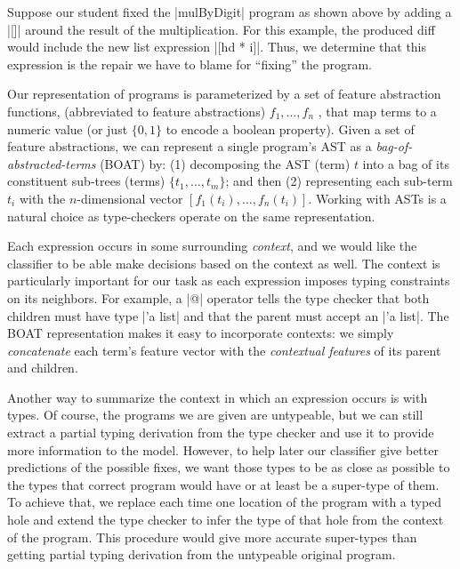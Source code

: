  Suppose our student fixed the |mulByDigit| program as shown
above by adding a |[]| around the result of the multiplication. For this
example, the produced diff would include the new list expression |[hd * i]|.
Thus, we determine that this expression is the repair we have to blame for
``fixing'' the program.

 Our representation of programs is
parameterized by a set of feature abstraction functions, (abbreviated to feature
abstractions) $f_1, \ldots, f_n$ , that map terms to a numeric value (or just
$\{0, 1\}$ to encode a boolean property). Given a set of feature abstractions,
we can represent a single program's AST as a \emph{bag-of-abstracted-terms}
(BOAT) by:
%
(1) decomposing the AST (term) $t$ into a bag of its constituent sub-trees
(terms) $\{t_1, \ldots, t_m\}$; and then
%
(2) representing each sub-term $t_i$ with the $n$-dimensional vector $[f_1(t_i),
\ldots, f_n(t_i)]$. Working with ASTs is a natural choice as type-checkers
operate on the same representation.

 Each expression occurs in some surrounding
\emph{context}, and we would like the classifier to be able make decisions based
on the context as well. The context is particularly important for our task as
each expression imposes typing constraints on its neighbors. For example, a |@|
operator tells the type checker that both children must have type |'a list| and
that the parent must accept an |'a list|. The BOAT representation makes it easy
to incorporate contexts: we simply \emph{concatenate} each term’s feature vector
with the \emph{contextual features} of its parent and children.

 Another way to summarize the context in which an
expression occurs is with types. Of course, the programs we are given are
untypeable, but we can still extract a partial typing derivation from the type
checker and use it to provide more information to the model. However, to help
later our classifier give better predictions of the possible fixes, we want
those types to be as close as possible to the types that correct program would
have or at least be a super-type of them. To achieve that, we replace each time
one location of the program with a typed hole and extend the type checker to
infer the type of that hole from the context of the program. This procedure
would give more accurate super-types than getting partial typing derivation from
the untypeable original program.




